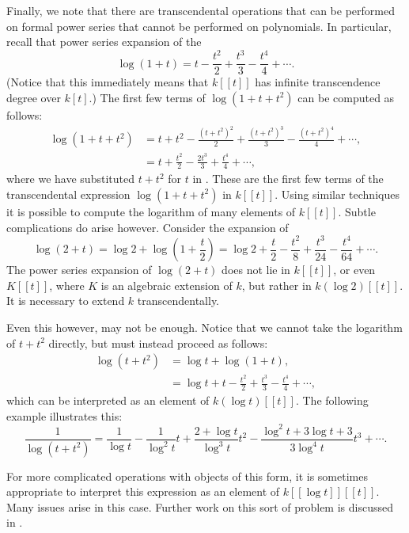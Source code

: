 \smallskip
Finally, we note that there are transcendental operations that can be
performed on formal power series that cannot be performed on
polynomials.  In particular, recall that power series expansion of the
\begin{equation} \label{Series:Log:Eq}
\log (1 + t) = t - \frac{t^2}{2} + \frac{t^3}{3} - \frac{t^4}{4} +
\cdots.
\end{equation}
(Notice that this immediately means that $k[[t]]$ has infinite
transcendence degree over $k[t]$.)  The first few terms of $\log
(1+t+t^2)$ can be computed as follows:
\[
\begin{aligned}
\log (1 + t +t^2) & = t + t^2 - \frac{(t+t^2)^2}{2} + \frac{(t+t^2)^3}{3}
  - \frac{(t+t^2)^4}{4} + \cdots,\\
 & = t + \frac{t^2}{2} - \frac{2t^3}{3} + \frac{t^4}{4} + \cdots,
\end{aligned}
\]
where we have substituted $t+t^2$ for $t$ in .
These are the first few terms of the transcendental
expression $\log (1+t+t^2)$ in $k[[t]]$.  Using similar techniques it is
possible to compute the logarithm of many elements of $k[[t]]$.  Subtle
complications do arise however.  Consider the expansion of 
\[
\log(2+t) = \log 2 + \log (1 + \frac{t}{2}) = \log 2 + \frac{t}{2} -
\frac{t^2}{8} + \frac{t^3}{24} - \frac{t^4}{64} + \cdots.
\]
The power series expansion of $\log(2 + t)$ does not lie in $k[[t]]$,
or even $K[[t]]$, where $K$ is an algebraic extension of $k$, but
rather in $k(\log 2)[[t]]$.  It is necessary to extend $k$
transcendentally.

Even this however, may not be enough.  Notice that we cannot take the
logarithm of $t+t^2$ directly, but must instead proceed as follows:
\[
\begin{aligned}
\log (t + t^2) & = \log t + \log (1 + t), \\
  & = \log t + t - \frac{t^2}{2} + \frac{t^3}{3} - \frac{t^4}{4} +
\cdots,
\end{aligned}
\]
which can be interpreted as an element of $k(\log t)[[t]]$.  The following
example illustrates this:
\[
\frac{1}{\log (t + t^2)} = \frac{1}{\log t} -
\frac{1}{\log^2 t} t + \frac{2 + \log t}{\log^3 t} t^2
- \frac{\log^2 t + 3 \log t + 3}{3 \log^4 t} t^3
+ \cdots.
\]

For more complicated operations with objects of this form, it
is sometimes appropriate to interpret this expression as an element of
$k[[\log t]][[t]]$.  Many issues arise in this case.  Further
work on this sort of problem is discussed in \cite{Shackell1990-ws}.


